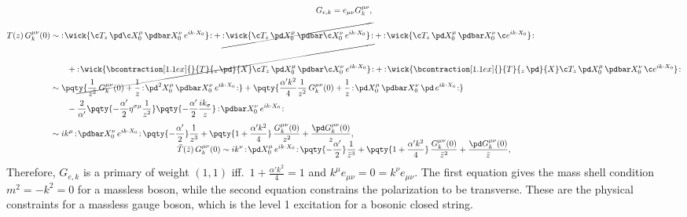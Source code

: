 \documentclass[a4paper,10pt]{article}
\begin{document}
\begin{enumerate}
\begin{enumerate}
	\begin{gather}
		G_{e,k}
		= e_{\mu\nu} G^{\mu\nu}_k,\\[1ex]
	\begin{aligned}
		T(z)\,G^{\mu\nu}_k(0)
		&\sim \normorder{\wick{
				\c T_z\,
				\pd \c X^\mu_0\,
				\pdbar X^\nu_0\,
				e^{ik\cdot X_0}
			}}
			+ \cancel{\normorder{\wick{
				\c T_z\,
				\pd X^\mu_0\,
				\pdbar \c X^\nu_0\,
				e^{ik\cdot X_0}
			}}}
			+ \normorder{\wick{
				\c T_z\,
				\pd X^\mu_0\,
				\pdbar X^\nu_0\,
				\c e^{ik\cdot X_0}
			}}
			\\ &\qquad
			+ \cancel{\normorder{\wick{
				\bcontraction[1.1ex]{}{T}{_z\,\pd}{X}
				\c T_z\,
				\pd X^\mu_0\,
				\pdbar \c X^\nu_0\,
				e^{ik\cdot X_0}
			}}}
			+ \normorder{\wick{
				\bcontraction[1.1ex]{}{T}{_z\,\pd}{X}
				\c T_z\,
				\pd X^\mu_0\,
				\pdbar X^\nu_0\,
				\c e^{ik\cdot X_0}
			}}
		\\
		&\sim \pqty{
				\frac{1}{z^2}\, G^{\mu\nu}_k(0)
				+ \frac{1}{z}\, \normorder{
					\pd^2 X^\mu_0\,
					\pdbar X^\nu_0\,
					e^{ik\cdot X_0}
				}
			}
			+ \pqty{
				\frac{\alpha'k^2}{4}
				\frac{1}{z^2}\, G^{\mu\nu}_k(0)
				+ \frac{1}{z}\, \normorder{
					\pd X^\mu_0\,
					\pdbar X^\nu_0\,
					\pd\,e^{ik\cdot X_0}
				}
			}
			\\ &\qquad
			- \frac{2}{\alpha'}
				\pqty{
					-\frac{\alpha'}{2}
					\eta^{\sigma\mu}
					\frac{1}{z^2}
				} \pqty{
					-\frac{\alpha'}{2}
					\frac{ik_\sigma}{z}
				}\, \normorder{
					\pdbar X^\nu_0\,
					e^{ik\cdot X_0}
				}
		\\[1ex]
		&\sim
			ik^\mu\,\normorder{
					\pdbar X^\nu_0\,
					e^{ik\cdot X_0}
				}\,
				\pqty{-\frac{\alpha'}{2}}
				\frac{1}{z^3}
			+ \pqty{
					1 + \frac{\alpha'k^2}{4}
				}\, \frac{G^{\mu\nu}_k(0)}{z^2}
			+ \frac{\pd G^{\mu\nu}_k(0)}{z},
		\\[-1.25\baselineskip]
	\end{aligned}\\[.8\baselineskip]
		\tilde{T}(\bar{z})\,G^{\mu\nu}_k(0)
		\sim
			ik^\nu\,\normorder{
					\pd X^\mu_0\,
					e^{ik\cdot X_0}
				}\,
				\pqty{-\frac{\alpha'}{2}}
				\frac{1}{\bar{z}^3}
			+ \pqty{
					1 + \frac{\alpha'k^2}{4}
				}\, 
				\frac{G^{\mu\nu}_k(0)}{\bar{z}^2}
			+ \frac{\pd G^{\mu\nu}_k(0)}{\bar{z}},
	\end{gather}
	Therefore, $G_{e,k}$ is a primary of weight $(1,1)$ iff.~$
		1 + \frac{\alpha'k^2}{4} = 1
	$ and $
		k^\mu e_{\mu\nu}
		= 0 = k^\nu e_{\mu\nu}
	$. The first equation gives the mass shell condition $
		m^2 = -k^2 = 0
	$ for a massless boson, while the second equation constrains the polarization to be transverse. These are the physical constraints for a massless gauge boson, which is the level 1 excitation for a bosonic closed string. 
	

\end{enumerate}
\end{enumerate}
\end{document}

